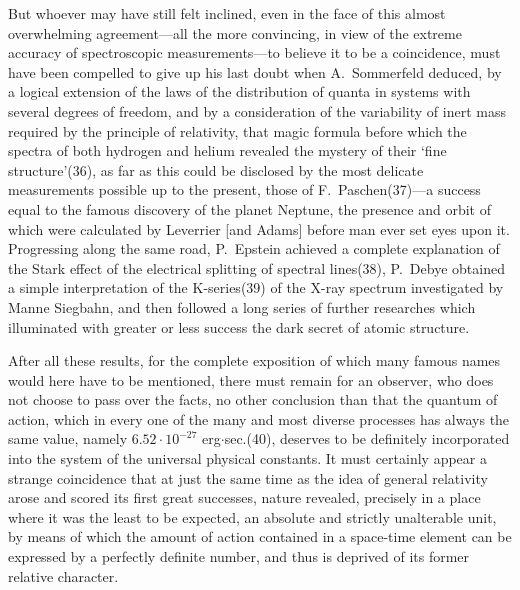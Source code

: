 \documentclass[12pt,oneside]{book}
\begin{document}
But whoever may have still felt inclined, even in the
face of this almost overwhelming agreement---all the more
convincing, in view of the extreme accuracy of spectroscopic
measurements---to believe it to be a coincidence,
must have been compelled to give up his last doubt when
A.~Sommerfeld deduced, by a logical extension of the laws
of the distribution of quanta in systems with several degrees
of freedom, and by a consideration of the variability of
inert mass required by the principle of relativity, that
magic formula before which the spectra of both hydrogen
and helium revealed the mystery of their `fine structure'(36),
as far as this could be disclosed by the most delicate
measurements possible up to the present, those of
F.~Paschen(37)---a success equal to the famous discovery
of the planet Neptune, the presence and orbit of which
were calculated by Leverrier [and Adams] before man
ever set eyes upon it. Progressing along the same road,
P.~Epstein achieved a complete explanation of the Stark effect
of the electrical splitting of spectral lines(38), P.~Debye obtained
a simple interpretation of the K-series(39) of the X-ray
spectrum investigated by Manne Siegbahn, and then followed
a long series of further researches which illuminated with
greater or less success the dark secret of atomic structure.

After all these results, for the complete exposition of
which many famous names would here have to be mentioned,
there must remain for an observer, who does not
choose to pass over the facts, no other conclusion than that
the quantum of action, which in every one of the many
and most diverse processes has always the same value,
namely $6.52 \cdot 10^{-27}$ erg$\cdot$sec.(40), deserves to be definitely
incorporated into the system of the universal physical constants.
It must certainly appear a strange coincidence that
at just the same time as the idea of general relativity arose
and scored its first great successes, nature revealed, precisely
in a place where it was the least to be expected, an
absolute and strictly unalterable unit, by means of which
the amount of action contained in a space-time element can
be expressed by a perfectly definite number, and thus is
deprived of its former relative character.
\end{document}

